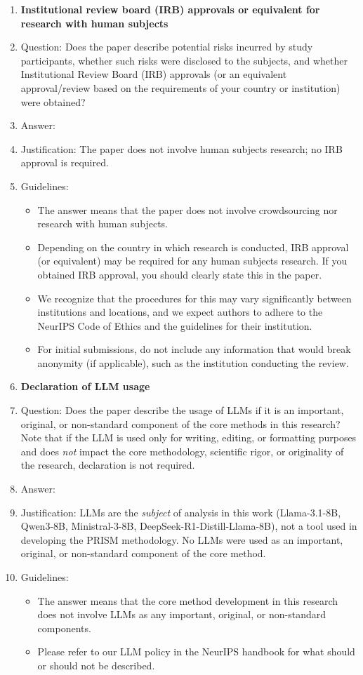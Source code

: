 \begin{enumerate}
\item {\bf Institutional review board (IRB) approvals or equivalent for research with human subjects}
    \item[] Question: Does the paper describe potential risks incurred by study participants, whether such risks were disclosed to the subjects, and whether Institutional Review Board (IRB) approvals (or an equivalent approval/review based on the requirements of your country or institution) were obtained?
    \item[] Answer: \answerNA{}
    \item[] Justification: The paper does not involve human subjects research; no IRB approval is required.
    \item[] Guidelines:
    \begin{itemize}
        \item The answer \answerNA{} means that the paper does not involve crowdsourcing nor research with human subjects.
        \item Depending on the country in which research is conducted, IRB approval (or equivalent) may be required for any human subjects research. If you obtained IRB approval, you should clearly state this in the paper.
        \item We recognize that the procedures for this may vary significantly between institutions and locations, and we expect authors to adhere to the NeurIPS Code of Ethics and the guidelines for their institution.
        \item For initial submissions, do not include any information that would break anonymity (if applicable), such as the institution conducting the review.
    \end{itemize}

\item {\bf Declaration of LLM usage}
    \item[] Question: Does the paper describe the usage of LLMs if it is an important, original, or non-standard component of the core methods in this research? Note that if the LLM is used only for writing, editing, or formatting purposes and does \emph{not} impact the core methodology, scientific rigor, or originality of the research, declaration is not required.
    \item[] Answer: \answerNA{}
    \item[] Justification: LLMs are the \emph{subject} of analysis in this work (Llama-3.1-8B, Qwen3-8B, Ministral-3-8B, DeepSeek-R1-Distill-Llama-8B), not a tool used in developing the PRISM methodology. No LLMs were used as an important, original, or non-standard component of the core method.
    \item[] Guidelines:
    \begin{itemize}
        \item The answer \answerNA{} means that the core method development in this research does not involve LLMs as any important, original, or non-standard components.
        \item Please refer to our LLM policy in the NeurIPS handbook for what should or should not be described.
    \end{itemize}

\end{enumerate}
